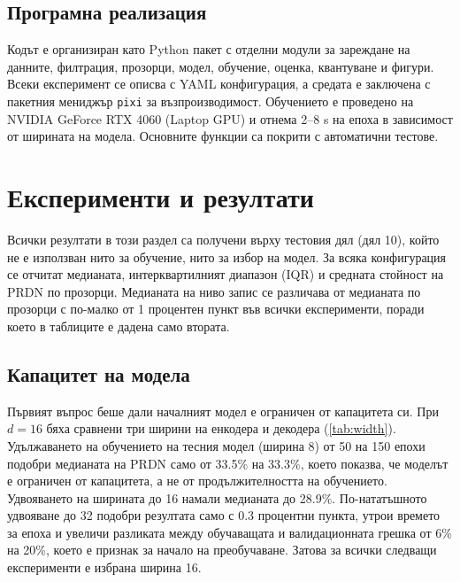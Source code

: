 \documentclass[12pt,a4paper]{article}
\begin{document}
\subsection{Програмна реализация}
Кодът е организиран като Python пакет с отделни модули за зареждане на данните, филтрация, прозорци, модел, обучение, оценка, квантуване и фигури. Всеки експеримент се описва с YAML конфигурация, а средата е заключена с пакетния мениджър \texttt{pixi} \cite{pixi} за възпроизводимост. Обучението е проведено на NVIDIA GeForce RTX 4060 (Laptop GPU) и отнема 2--8 s на епоха в зависимост от ширината на модела. Основните функции са покрити с автоматични тестове.

\section{Експерименти и резултати}
Всички резултати в този раздел са получени върху тестовия дял (дял 10), който не е използван нито за обучение, нито за избор на модел. За всяка конфигурация се отчитат медианата, интерквартилният диапазон (IQR) и средната стойност на PRDN по прозорци. Медианата на ниво запис се различава от медианата по прозорци с по-малко от 1 процентен пункт във всички експерименти, поради което в таблиците е дадена само втората.

\subsection{Капацитет на модела}
Първият въпрос беше дали началният модел е ограничен от капацитета си. При \(d = 16\) бяха сравнени три ширини на енкодера и декодера (\cref{tab:width}). Удължаването на обучението на тесния модел (ширина 8) от 50 на 150 епохи подобри медианата на PRDN само от 33.5\% на 33.3\%, което показва, че моделът е ограничен от капацитета, а не от продължителността на обучението. Удвояването на ширината до 16 намали медианата до 28.9\%. По-нататъшното удвояване до 32 подобри резултата само с 0.3 процентни пункта, утрои времето за епоха и увеличи разликата между обучаващата и валидационната грешка от 6\% на 20\%, което е признак за начало на преобучаване. Затова за всички следващи експерименти е избрана ширина 16.
\end{document}
